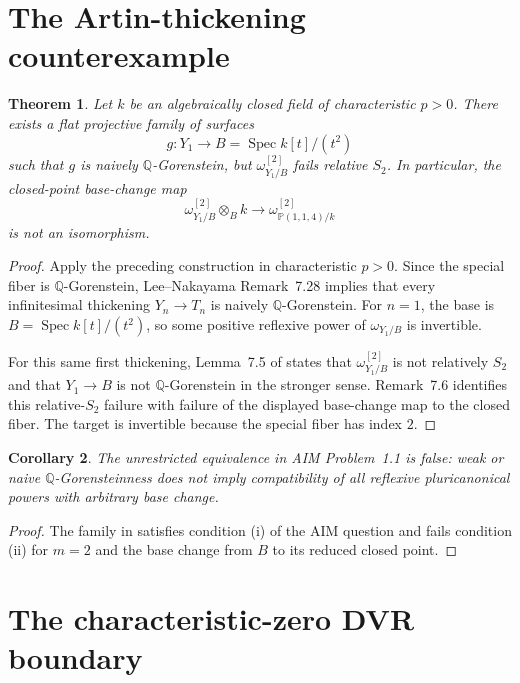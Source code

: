 \documentclass[10pt,reqno]{amsart}
\newtheorem{theorem}{Theorem}[section]
\newtheorem{corollary}[theorem]{Corollary}
\theoremstyle{definition}
\begin{document}
\section{The Artin-thickening counterexample}

\begin{theorem}\label{thm:counterexample}
Let $k$ be an algebraically closed field of characteristic $p>0$. There exists a flat projective family of surfaces
\[
  g:Y_1\longrightarrow B=\operatorname{Spec}k[t]/(t^2)
\]
such that $g$ is naively $\mathbb Q$-Gorenstein, but $\omega_{Y_1/B}^{[2]}$ fails relative $S_2$. In particular, the closed-point base-change map
\[
  \omega_{Y_1/B}^{[2]}\otimes_B k
  \longrightarrow
  \omega_{\mathbb P(1,1,4)/k}^{[2]}
\]
is not an isomorphism.
\end{theorem}

\begin{proof}
Apply the preceding construction in characteristic $p>0$. Since the special fiber is $\mathbb Q$-Gorenstein, Lee--Nakayama Remark~7.28 implies that every infinitesimal thickening $Y_n\to T_n$ is naively $\mathbb Q$-Gorenstein. For $n=1$, the base is $B=\operatorname{Spec}k[t]/(t^2)$, so some positive reflexive power of $\omega_{Y_1/B}$ is invertible.

For this same first thickening, Lemma~7.5 of \cite{LeeNakayama} states that $\omega_{Y_1/B}^{[2]}$ is not relatively $S_2$ and that $Y_1\to B$ is not $\mathbb Q$-Gorenstein in the stronger sense. Remark~7.6 identifies this relative-$S_2$ failure with failure of the displayed base-change map to the closed fiber. The target is invertible because the special fiber has index $2$.
\end{proof}

\begin{corollary}\label{cor:aim}
The unrestricted equivalence in AIM Problem~1.1 is false: weak or naive $\mathbb Q$-Gorensteinness does not imply compatibility of all reflexive pluricanonical powers with arbitrary base change.
\end{corollary}

\begin{proof}
The family in  satisfies condition (i) of the AIM question and fails condition (ii) for $m=2$ and the base change from $B$ to its reduced closed point.
\end{proof}

\section{The characteristic-zero DVR boundary}
\end{document}
